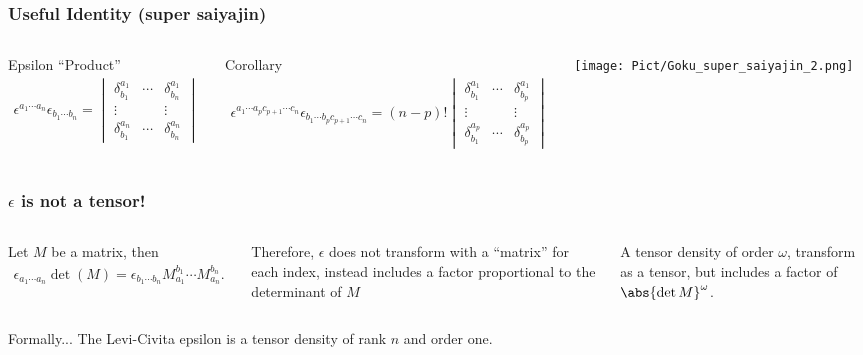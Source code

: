 \begin{frame}
  \frametitle{Useful Identity (super saiyajin)}
  \begin{columns}
    \begin{alertblock}{Epsilon ``Product''}
      \begin{align*}
        \epsilon^{a_1 \cdots a_n}\epsilon_{b_1 \cdots b_n}=
        \begin{vmatrix}
          \delta^{a_1}_{b_1} &\cdots&\delta^{a_1}_{b_n}\\
          \vdots & & \vdots \\
          \delta^{a_n}_{b_1}& \cdots & \delta^{a_n}_{b_n}
        \end{vmatrix}
      \end{align*}
    \end{alertblock}

    \begin{block}{Corollary}
      \begin{align*}
        \epsilon^{a_1 \cdots a_p c_{p+1}\cdots c_n}\epsilon_{b_1 \cdots b_p c_{p+1}\cdots c_n}= (n-p)!
        \begin{vmatrix}
          \delta^{a_1}_{b_1} &\cdots&\delta^{a_1}_{b_p}\\
          \vdots & & \vdots \\
          \delta^{a_p}_{b_1}& \cdots & \delta^{a_p}_{b_p}
        \end{vmatrix}
      \end{align*}
    \end{block}

    \begin{center}
      \texttt{[image: Pict/Goku\_super\_saiyajin\_2.png]}
    \end{center}
  \end{columns}
\end{frame}

\begin{frame}
  \frametitle{$\epsilon $ is not a tensor!}
  \begin{columns}
    Let $M$ be a matrix, then 
    \begin{align*}
      \epsilon_{a_1\cdots a_n} \det(M) = \epsilon_{b_1\cdots b_n} M_{a_1}^{b_1}\cdots M_{a_n}^{b_n}.
    \end{align*}
    
    Therefore,  $\epsilon$ does not transform with a ``matrix'' for each index, instead includes a factor proportional to the determinant of $M$
    \begin{definition}
      A \alert{tensor density} of order $\omega$, transform as a tensor, but includes a factor of $\abs{\det{M}}^\omega$.
    \end{definition}
  \end{columns}

  \begin{alertblock}{Formally...}
    The Levi-Civita epsilon is a tensor density of rank $n$ and order one.
  \end{alertblock}
\end{frame}

